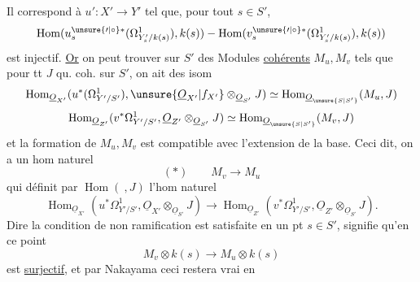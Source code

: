 Il correspond à $u':X'\longrightarrow Y'$ tel que, pour tout $s\in S'$,
\[
\operatorname{Hom}(u_s^{\unsure{\prime|\circ}*}(\Omega^1_{Y'_s/k(s)}),k(s))-\operatorname{Hom}(v_s^{\unsure{\prime|\circ}*}(\Omega^1_{Y'_s/k(s)}),k(s))
\]
est injectif. \uline{Or} on peut trouver sur $S'$ des Modules \uline{cohérents} $M_u,M_v$ tels que pour tt $J$ qu. coh. sur $S'$, on ait des isom 
\[
\operatorname{Hom}_{\underline{O}_{X'}}(u^*(\Omega^1_{Y'/S'}),\unsure{\underline{O}_{X'}|f_{X'}}\otimes_{\underline{O}_{S'}}J)\simeq\operatorname{Hom}_{\underline{O}_{\unsure{S|S'}}}(M_u,J)
\]
\[
\operatorname{Hom}_{\underline{O}_{Z'}}(v^*\Omega^1_{Y'/S'},\underline{O}_{Z'}\otimes_{\underline{O}_{S'}}J)\simeq\operatorname{Hom}_{\underline{O}_{\unsure{S|S'}}}(M_v,J)
\]
et la formation de $M_u,M_v$ est compatible avec l'extension de la base. Ceci dit, on a un hom naturel
\[
(*)\qquad M_v\longrightarrow M_u
\]
qui définit par $\operatorname{Hom}(\ ,J)$ l'hom naturel
\[
\operatorname{Hom}_{\underline{O}_{X'}}(u^*\Omega^1_{Y'/S'},\underline{O}_{X'}\otimes_{\underline{O}_{S'}}J)\longrightarrow\operatorname{Hom}_{\underline{O}_{Z'}}(v^*\Omega^1_{Y'/S'},\underline{O}_{Z'}\otimes_{\underline{O}_{S'}}J).
\]
Dire   la condition de non ramification est satisfaite en un pt $s\in S'$, signifie qu'en ce point
\[
M_v\otimes k(s)\longrightarrow M_u\otimes k(s)
\]
est \uline{surjectif}, et par Nakayama ceci restera vrai en

